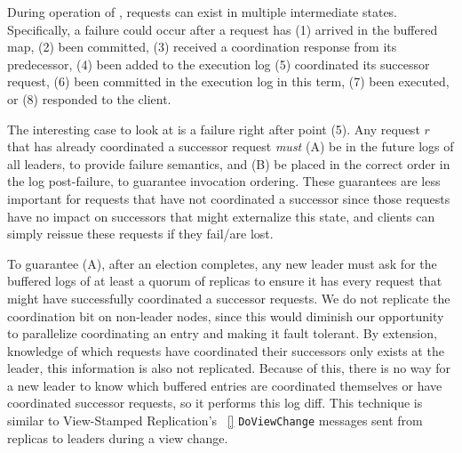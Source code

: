 During operation of \protocol, requests can exist in multiple intermediate states. Specifically, a failure could occur after a request has (1) arrived in the buffered map, (2) been committed, (3) received a coordination response from its predecessor, (4) been added to the execution log (5) coordinated its successor request, (6) been committed in the execution log in this term, (7) been executed, or (8) responded to the client. 


The interesting case to look at is a failure right after point (5). Any request $r$ that has already coordinated a successor request \textit{must} (A) be in the future logs of all leaders, to provide failure semantics, and (B) be placed in the correct order in the log post-failure, to guarantee invocation ordering. These guarantees are less important for requests that have not coordinated a successor since those requests have no impact on successors that might externalize this state, and clients can simply reissue these requests if they fail/are lost.


To guarantee (A), after an election completes, any new leader must ask for the buffered logs of at least a quorum of replicas to ensure it has every request that might have successfully coordinated a successor requests. We do not replicate the coordination bit on non-leader nodes, since this would diminish our opportunity to parallelize coordinating an entry and making it fault tolerant. By extension, knowledge of which requests have coordinated their successors only exists at the leader, this information is also not replicated. Because of this, there is no way for a new leader to know which buffered entries are coordinated themselves or have coordinated successor requests, so it performs this log diff. This technique is similar to View-Stamped Replication's ~\ref{} \texttt{DoViewChange} messages sent from replicas to leaders during a view change. 

